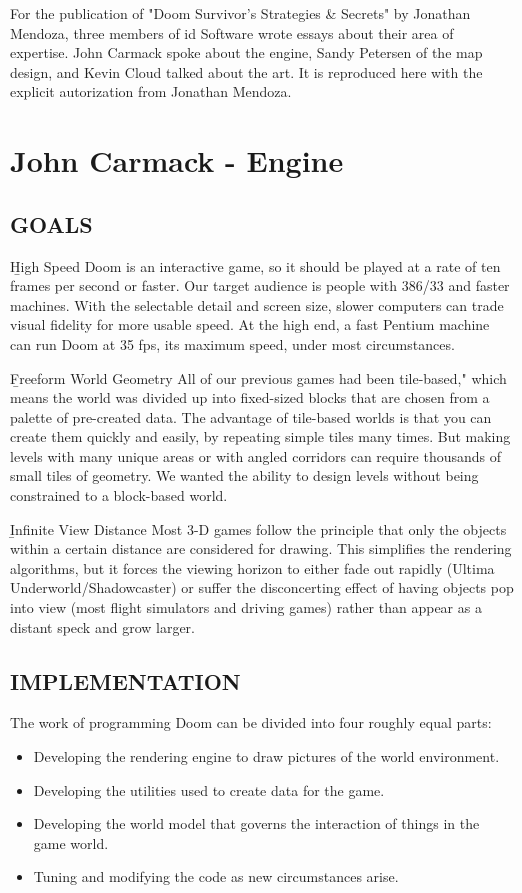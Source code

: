 For the publication of "Doom Survivor's Strategies \& Secrets" by Jonathan Mendoza, three members of id Software wrote essays about their area of expertise. John Carmack spoke about the engine, Sandy Petersen of the map design, and Kevin Cloud talked about the art. It is reproduced here with the explicit autorization from Jonathan Mendoza.\\
\par
\section{John Carmack - Engine}
\subsection{GOALS}
\b{High Speed} Doom is an interactive game, so it should be played at a rate of ten frames per second or faster. Our target audience is people with 386/33 and faster machines. With the selectable detail and screen size, slower computers can trade visual fidelity for more usable speed. At the high end, a fast Pentium machine can run Doom at 35 fps, its maximum speed, under most circumstances.\\
\par

\b{Freeform World Geometry} All of our previous games had been tile-based," which means the world was divided up into fixed-sized blocks that are chosen from a palette of pre-created data. The advantage of tile-based worlds is that you can create them quickly and easily, by repeating simple tiles many times. But making levels with many unique areas or with angled corridors can require thousands of small tiles of geometry. We wanted the ability to design levels without being constrained to a block-based world.\\
\par 
\b{Infinite View Distance} Most 3-D games
follow the principle that only the objects within a certain distance are considered for drawing.
This simplifies the rendering algorithms, but it forces the viewing horizon to either fade out rapidly (Ultima Underworld/Shadowcaster) or suffer the disconcerting effect of having objects pop into view (most flight simulators and driving games) rather than appear as a distant speck and grow larger.
\par
\subsection{IMPLEMENTATION}
The work of programming Doom can be divided into four roughly
equal parts:
\begin{itemize}
\item Developing the rendering engine
to draw pictures
of the world
environment.
\item Developing the utilities used to create data for the game.
\item Developing the world model that governs
the interaction of
things in the game world.
\item Tuning and modifying
the code as new circumstances arise.
\end{itemize}


